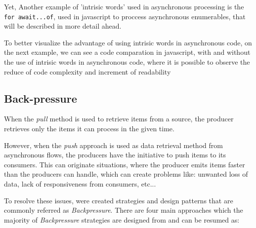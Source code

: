 	Yet, Another example of 'intrisic words' used in asynchronous processing is the \texttt{for await...of}, used in javascript to proccess asynchronous enumerables, that will be described in more detail ahead. 
	
	To better visualize the advantage of using intrisic words in asynchronous code, on the next example, we can see a code comparation in javascript, with and without the use of intrisic words in asynchronous code, where it is possible to observe the reduce of code complexity and increment of readability 
	
	

	
	\clearpage

	\subsection{Back-pressure} 

	When the \textit{pull} method is used to retrieve items from a source, the producer retrieves only the items it can process in the given time. 
	
	However, when the \textit{push} approach is used as data retrieval method from asynchronous flows, the producers have the initiative to push items to its consumers. 
	This can originate situations, where the producer emits items faster than the producers can handle, which can create problems like: unwanted loss of data, lack of responsiveness from consumers, etc... 
	
	To resolve these issues, were created strategies and design patterns that are commonly referred as \textit{Backpressure}.
	There are four main approaches which the majority of \textit{Backpressure} strategies are designed from and can be resumed as: 
	
